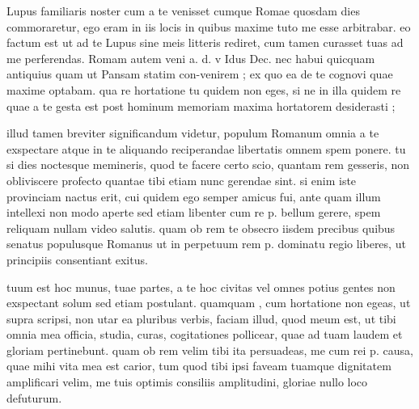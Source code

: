 


 Lupus familiaris noster cum a te venisset cumque Romae quosdam dies commoraretur, ego eram in iis locis in quibus maxime tuto me esse arbitrabar. eo factum est ut ad te Lupus sine meis litteris rediret, cum tamen curasset tuas ad me perferendas. Romam autem veni a. d. v Idus Dec. nec habui quicquam antiquius quam ut Pansam statim con-venirem ; ex quo ea de te cognovi quae maxime optabam. qua re hortatione tu quidem non eges, si ne in illa quidem re quae a te gesta est post hominum memoriam maxima hortatorem desiderasti ;

 illud tamen breviter significandum videtur, populum Romanum omnia a te exspectare atque in te aliquando reciperandae libertatis omnem spem ponere. tu si dies noctesque memineris, quod te facere certo scio, quantam rem gesseris, non obliviscere profecto quantae tibi etiam nunc gerendae sint. si enim iste provinciam nactus erit, cui quidem ego semper amicus fui, ante quam illum intellexi non modo aperte sed etiam libenter cum re p. bellum gerere, spem reliquam nullam video salutis. quam ob rem te obsecro iisdem precibus quibus senatus populusque Romanus ut in perpetuum rem p. dominatu regio liberes, ut principiis consentiant exitus.

 tuum est hoc munus, tuae partes, a te hoc civitas vel omnes potius gentes non exspectant solum sed etiam postulant. quamquam , cum hortatione non egeas, ut supra scripsi, non utar ea pluribus verbis, faciam illud, quod meum est, ut tibi omnia mea officia, studia, curas, cogitationes pollicear, quae ad tuam laudem et gloriam pertinebunt. quam ob rem velim tibi ita persuadeas, me cum rei p. causa, quae mihi vita mea est carior, tum quod tibi ipsi faveam tuamque dignitatem amplificari velim, me tuis optimis consiliis amplitudini, gloriae nullo loco defuturum.

